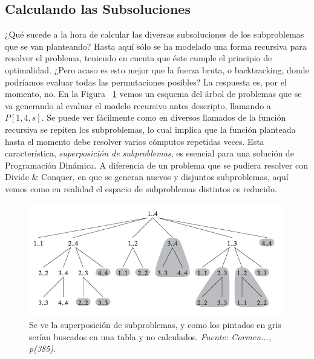 \subsection{Calculando las Subsoluciones}

¿Qué sucede a la hora de calcular las diversas subsoluciones de los subproblemas que se van planteando? Hasta aquí sólo se ha modelado una forma recursiva para resolver el problema, teniendo en cuenta que éste cumple el principio de optimalidad. ¿Pero acaso es esto mejor que la fuerza bruta, o backtracking, donde podríamos evaluar todas las permutaciones posibles? La respuesta es, por el momento, no. En la Figura ~\ref{fig:overl} vemos un esquema del árbol de problemas que se va generando al evaluar el modelo recursivo antes descripto, llamando a $P[1,4,s]$. Se puede ver fácilmente como en diversos llamados de la función recursiva se repiten los subproblemas, lo cual implica que la función planteada hasta el momento debe resolver varios cómputos repetidas veces. Esta característica, \textsl{superposición de subproblemas}, es esencial para una solución de Programación Dinámica. A diferencia de un problema que se pudiera resolver con Divide \& Conquer, en que se generan nuevos y disjuntos subproblemas, aquí vemos como en realidad el espacio de subproblemas distintos es reducido.\\
\begin{figure}[h]
\centering                                                       
        \includegraphics[width=320pt]{./figs/p3overlapping.png}
	\caption{Se ve la superposición de subproblemas, y como los pintados en gris serían buscados en una tabla y no calculados. \textsl{Fuente: Cormen..., p(385)}. }
	\label{fig:overl}
\end{figure}
